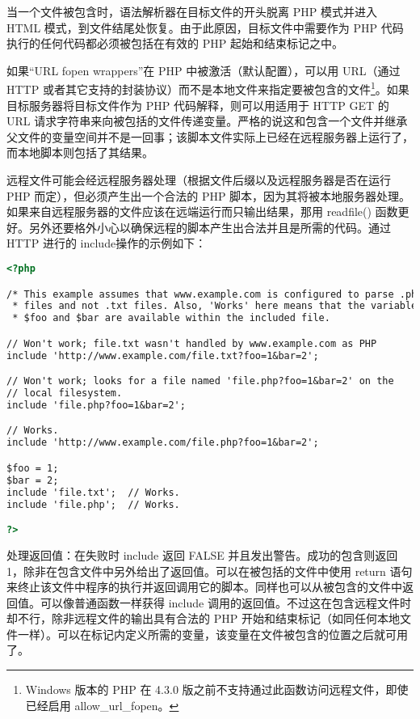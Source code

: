 当一个文件被包含时，语法解析器在目标文件的开头脱离 PHP 模式并进入 HTML 模式，到文件结尾处恢复。由于此原因，目标文件中需要作为 PHP 代码执行的任何代码都必须被包括在有效的 PHP 起始和结束标记之中。

如果“URL fopen wrappers”在 PHP 中被激活（默认配置），可以用 URL（通过 HTTP 或者其它支持的封装协议）而不是本地文件来指定要被包含的文件\footnote{Windows 版本的 PHP 在 4.3.0 版之前不支持通过此函数访问远程文件，即使已经启用 allow\_url\_fopen。}。如果目标服务器将目标文件作为 PHP 代码解释，则可以用适用于 HTTP GET 的 URL 请求字符串来向被包括的文件传递变量。严格的说这和包含一个文件并继承父文件的变量空间并不是一回事；该脚本文件实际上已经在远程服务器上运行了，而本地脚本则包括了其结果。

远程文件可能会经远程服务器处理（根据文件后缀以及远程服务器是否在运行 PHP 而定），但必须产生出一个合法的 PHP 脚本，因为其将被本地服务器处理。如果来自远程服务器的文件应该在远端运行而只输出结果，那用 readfile() 函数更好。另外还要格外小心以确保远程的脚本产生出合法并且是所需的代码。通过 HTTP 进行的 include操作的示例如下：


\begin{lstlisting}[language=HTML]
<?php

/* This example assumes that www.example.com is configured to parse .php *
 * files and not .txt files. Also, 'Works' here means that the variables *
 * $foo and $bar are available within the included file.                 */

// Won't work; file.txt wasn't handled by www.example.com as PHP
include 'http://www.example.com/file.txt?foo=1&bar=2';

// Won't work; looks for a file named 'file.php?foo=1&bar=2' on the
// local filesystem.
include 'file.php?foo=1&bar=2';

// Works.
include 'http://www.example.com/file.php?foo=1&bar=2';

$foo = 1;
$bar = 2;
include 'file.txt';  // Works.
include 'file.php';  // Works.

?>
\end{lstlisting}

处理返回值：在失败时 include 返回 FALSE 并且发出警告。成功的包含则返回 1，除非在包含文件中另外给出了返回值。可以在被包括的文件中使用 return 语句来终止该文件中程序的执行并返回调用它的脚本。同样也可以从被包含的文件中返回值。可以像普通函数一样获得 include 调用的返回值。不过这在包含远程文件时却不行，除非远程文件的输出具有合法的 PHP 开始和结束标记（如同任何本地文件一样）。可以在标记内定义所需的变量，该变量在文件被包含的位置之后就可用了。


